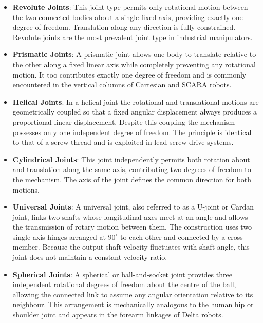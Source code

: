 \begin{itemize}
    \item \textbf{Revolute Joints}: This joint type permits only
    rotational motion between the two connected bodies about a single
    fixed axis, providing exactly one degree of freedom. Translation
    along any direction is fully constrained. Revolute joints are the
    most prevalent joint type in industrial manipulators.

    \item \textbf{Prismatic Joints}: A prismatic joint allows one
    body to translate relative to the other along a fixed linear axis
    while completely preventing any rotational motion. It too
    contributes exactly one degree of freedom and is commonly
    encountered in the vertical columns of Cartesian and SCARA robots.

    \item \textbf{Helical Joints}: In a helical joint the rotational
    and translational motions are geometrically coupled so that a
    fixed angular displacement always produces a proportional linear
    displacement. Despite this coupling the mechanism possesses only
    one independent degree of freedom. The principle is identical to
    that of a screw thread and is exploited in lead-screw drive
    systems.

    \item \textbf{Cylindrical Joints}: This joint independently
    permits both rotation about and translation along the same axis,
    contributing two degrees of freedom to the mechanism. The axis of
    the joint defines the common direction for both motions.

    \item \textbf{Universal Joints}: A universal joint, also referred
    to as a U-joint or Cardan joint, links two shafts whose
    longitudinal axes meet at an angle and allows the transmission of
    rotary motion between them. The construction uses two single-axis
    hinges arranged at $90^{\circ}$ to each other and connected by
    a cross-member. Because the output shaft velocity fluctuates
    with shaft angle, this joint does not maintain a constant
    velocity ratio.

    \item \textbf{Spherical Joints}: A spherical or ball-and-socket
    joint provides three independent rotational degrees of freedom
    about the centre of the ball, allowing the connected link to
    assume any angular orientation relative to its neighbour. This
    arrangement is mechanically analogous to the human hip or
    shoulder joint and appears in the forearm linkages of Delta
    robots.
\end{itemize}


